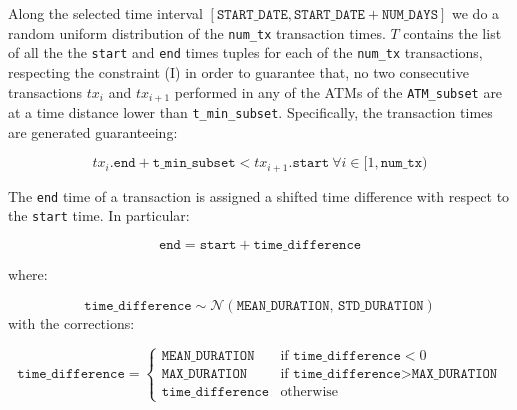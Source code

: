 \begin{enumerate}
    Along the selected time interval $[\texttt{START\_DATE}, \texttt{START\_DATE} + \texttt{NUM\_DAYS}]$ we do a random uniform distribution of the \texttt{num\_tx} transaction times. $T$ contains the list of all the the \texttt{start} and \texttt{end} times tuples for each of the \texttt{num\_tx} transactions, respecting the constraint (I) in order to guarantee that, no two consecutive transactions $tx_i$ and $tx_{i+1}$ performed in any of the ATMs of the \texttt{ATM\_subset} are at a time distance lower than \texttt{t\_min\_subset}. Specifically, the transaction times are generated guaranteeing:

    $$tx_i.\texttt{end} + \texttt{t\_min\_subset} < tx_{i+1}.\texttt{start} \ \forall i \in [1,\texttt{num\_tx})$$

    The \texttt{end} time of a transaction is assigned a shifted time difference with respect to the \texttt{start} time. In particular:

    $$
    \texttt{end} = \texttt{start} + \texttt{time\_difference}
    $$

    where:

    $$\texttt{time\_difference} \sim \mathcal{N}(\texttt{MEAN\_DURATION},\,\texttt{STD\_DURATION})$$ with the corrections:

    $$
    \texttt{time\_difference} =
    \begin{cases} 
        \texttt{MEAN\_DURATION} & \text{if } \texttt{time\_difference} < 0 \\
        \texttt{MAX\_DURATION} & \text{if } \texttt{time\_difference} > \texttt{MAX\_DURATION} \\
        \texttt{time\_difference} & \text{otherwise}
    \end{cases}
    $$



\end{enumerate}
